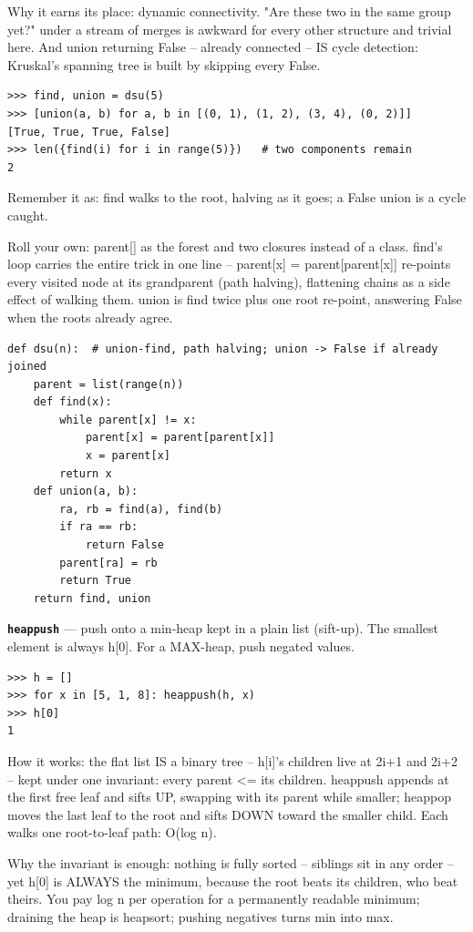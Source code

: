 \documentclass[10pt,letterpaper]{article}
\begin{document}
Why it earns its place: dynamic connectivity. "Are these two in the same group yet?" under a stream of merges is awkward for every other structure and trivial here. And union returning False -- already connected -- IS cycle detection: Kruskal's spanning tree is built by skipping every False.

\begin{lstlisting}[style=ex]
>>> find, union = dsu(5)
>>> [union(a, b) for a, b in [(0, 1), (1, 2), (3, 4), (0, 2)]]
[True, True, True, False]
>>> len({find(i) for i in range(5)})   # two components remain
2
\end{lstlisting}

Remember it as: find walks to the root, halving as it goes; a False union is a cycle caught.


Roll your own: parent[] as the forest and two closures instead of a class. find's loop carries the entire trick in one line -- parent[x] = parent[parent[x]] re-points every visited node at its grandparent (path halving), flattening chains as a side effect of walking them. union is find twice plus one root re-point, answering False when the roots already agree.

\begin{lstlisting}[style=ex]
def dsu(n):  # union-find, path halving; union -> False if already joined
    parent = list(range(n))
    def find(x):
        while parent[x] != x:
            parent[x] = parent[parent[x]]
            x = parent[x]
        return x
    def union(a, b):
        ra, rb = find(a), find(b)
        if ra == rb:
            return False
        parent[ra] = rb
        return True
    return find, union
\end{lstlisting}
\textbf{\texttt{heappush}} --- push onto a min-heap kept in a plain list (sift-up). The smallest element is always h[0]. For a MAX-heap, push negated values.
\begin{lstlisting}[style=ex]
>>> h = []
>>> for x in [5, 1, 8]: heappush(h, x)
>>> h[0]
1
\end{lstlisting}

How it works: the flat list IS a binary tree -- h[i]'s children live at 2i+1 and 2i+2 -- kept under one invariant: every parent <= its children. heappush appends at the first free leaf and sifts UP, swapping with its parent while smaller; heappop moves the last leaf to the root and sifts DOWN toward the smaller child. Each walks one root-to-leaf path: O(log n).


Why the invariant is enough: nothing is fully sorted -- siblings sit in any order -- yet h[0] is ALWAYS the minimum, because the root beats its children, who beat theirs. You pay log n per operation for a permanently readable minimum; draining the heap is heapsort; pushing negatives turns min into max.
\end{document}
